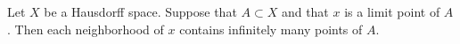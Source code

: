 Let $X$ be a Hausdorff space. Suppose that $A \subset X$ and that $x$ is a limit point of $A$. Then each neighborhood of $x$ contains infinitely many points of $A$.